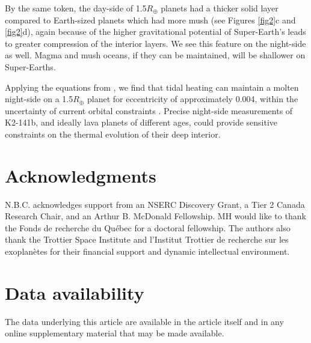 \documentclass[fleqn,usenatbib]{mnras}
\begin{document}
By the same token, the day-side of 1.5$R_{\oplus}$ planets had a thicker solid layer compared to Earth-sized planets which had more mush (see Figures \ref{fig2}c and \ref{fig2}d), again because of the higher gravitational potential of Super-Earth's leads to greater compression of the interior layers. We see this feature on the night-side as well. Magma and mush oceans, if they can be maintained, will be shallower on Super-Earths. 

Applying the equations from \cite{Dris2015}, we find that tidal heating can maintain a molten night-side on a 1.5$R_{\oplus}$ planet for eccentricity of approximately 0.004, within the uncertainty of current orbital constraints \citep{Malavolta2018, Barragan2018, Zie2022}. Precise night-side measurements of K2-141b, and ideally lava planets of different ages, could provide sensitive constraints on the thermal evolution of their deep interior. 


\section*{Acknowledgments}

N.B.C. acknowledges support from an NSERC Discovery Grant, a Tier 2 Canada Research Chair, and an Arthur B. McDonald Fellowship. MH would like to thank the Fonds de recherche du Québec for a doctoral fellowship.  The authors also thank the Trottier Space Institute and l'Institut Trottier de recherche sur les exoplanètes for their financial support and dynamic intellectual environment.


\section*{Data availability}

The data underlying this article are available in the article itself and in any online supplementary material that may be made available.











\end{document}
